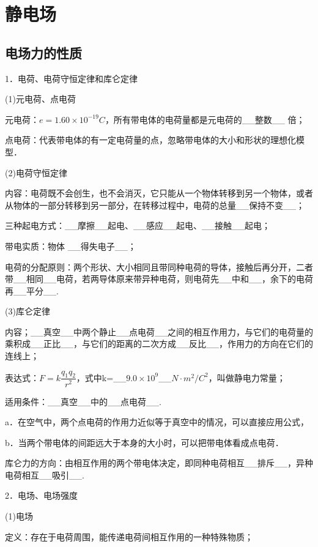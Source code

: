 \documentclass[cn,10.5pt,chinese,mac,chinesefont=founder]{elegantbook}
\begin{document}
\chapter{静电场}
\section{电场力的性质}





1．电荷、电荷守恒定律和库仑定律

(1)元电荷、点电荷

元电荷：$e=1.60\times10^{-19}C$，所有带电体的电荷量都是元电荷的\_\_整数\_\_
倍；

点电荷：代表带电体的有一定电荷量的点，忽略带电体的大小和形状的理想化模型．

(2)电荷守恒定律

内容：电荷既不会创生，也不会消灭，它只能从一个物体转移到另一个物体，或者从物体的一部分转移到另一部分，在转移过程中，电荷的总量\_\_保持不变\_\_；

三种起电方式：\_\_摩擦\_\_起电、\_\_感应\_\_起电、\_\_接触\_\_起电；

带电实质：物体 \_\_得失电子\_\_；

电荷的分配原则：两个形状、大小相同且带同种电荷的导体，接触后再分开，二者带\_\_相同\_\_电荷，若两导体原来带异种电荷，则电荷先\_\_中和\_\_，余下的电荷再\_\_平分\_\_.

(3)库仑定律

内容；\_\_真空\_\_中两个静止\_\_点电荷\_\_之间的相互作用力，与它们的电荷量的乘积成\_\_正比\_\_，与它们的距离的二次方成\_\_反比\_\_，作用力的方向在它们的连线上；

表达式：$F=k\dfrac{q_1q_2}{r^2}$，式中k=\_\_$9.0\times 10^9$\_\_$N\cdot m^2/C^2$，叫做静电力常量；

适用条件：\_\_真空\_\_中的\_\_点电荷\_\_.

a．在空气中，两个点电荷的作用力近似等于真空中的情况，可以直接应用公式，

b．当两个带电体的间距远大于本身的大小时，可以把带电体看成点电荷．

库仑力的方向：由相互作用的两个带电体决定，即同种电荷相互\_\_排斥\_\_，异种电荷相互\_\_吸引\_\_.

2．电场、电场强度

(1)电场

定义：存在于电荷周围，能传递电荷间相互作用的一种特殊物质；
\end{document}

